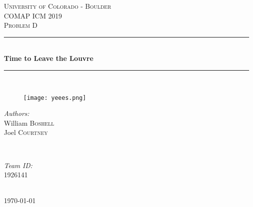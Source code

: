 \documentclass[12pt]{article}
\begin{document}
\begin{titlepage}

\newcommand{\HRule}{\rule{\linewidth}{0.5mm}}

\center
 
\textsc{\LARGE University of Colorado - Boulder}\\[1cm]
\textsc{\large COMAP ICM 2019}\\[0.5cm] %
\textsc{\large Problem D}\\[0.5cm] %

\HRule \\[0.5cm]
{ \huge \bfseries Time to Leave the Louvre }\\[0.1cm] 
\HRule \\[.4cm]

\begin{figure}[H]
  \centering\texttt{[image: yeees.png]}
  \label{fig:yeeees}
\end{figure}

\vfill
\begin{minipage}{0.4\textwidth}
\begin{flushleft} \large
\emph{Authors:}\\
William \textsc{Boshell} \\
Joel  
 \textsc{Courtney}
\end{flushleft}


\end{minipage}
~
\begin{minipage}{0.4\textwidth}
\begin{flushright} \large
\emph{Team ID:} \\
\textsc{1926141} 
\end{flushright}
\end{minipage}\\[1cm]


{\large \today}\\[1cm]
 

\end{titlepage}
\newpage

\tableofcontents
\newpage
\end{document}
